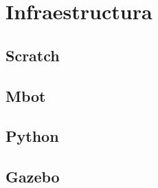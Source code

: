 \chapter{Infraestructura}\label{cap:infra}

\section{Scratch}\label{sec:scratch}
\section{Mbot}\label{sec:mbot}
\section{Python}\label{sec:python}
\section{Gazebo}\label{sec:gazebo}